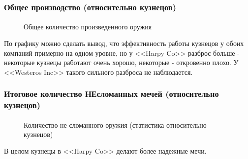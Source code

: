 \documentclass[10pt,pdf,hyperref={unicode}]{beamer}
\begin{document}
\begin{frame}
\frametitle{Общее производство (относительно кузнецов)} 
\framesubtitle{}

\begin{minipage}{0.4\textwidth}
 	\begin{figure}[L]
		\caption{Общее количество произведенного оружия}	
	\end{figure}
\end{minipage}
\hfill
\begin{minipage}{0.4\textwidth}
	По графику можно сделать вывод, что эффективность работы кузнецов у обоих компаний примерно на одном уровне, но у <<Harpy Co>> разброс больше - некоторые кузнецы работают очень хорошо, некоторые - откровенно плохо. У <<Westeros Inc>> такого сильного разброса не наблюдается.   
\end{minipage}
\end{frame}

\begin{frame}
\frametitle{Итоговое количество НЕсломанных мечей (относительно кузнецов)} 
\framesubtitle{}

\begin{minipage}{0.4\textwidth}
 	\begin{figure}[L]
		\caption{Количество не сломанного оружия (статистика относительно кузнецов)}	
	\end{figure}
\end{minipage}
\hfill
\begin{minipage}{0.4\textwidth}
	В целом кузнецы в <<Harpy Co>> делают более надежные мечи.
\end{minipage}
\end{frame}
\end{document}
